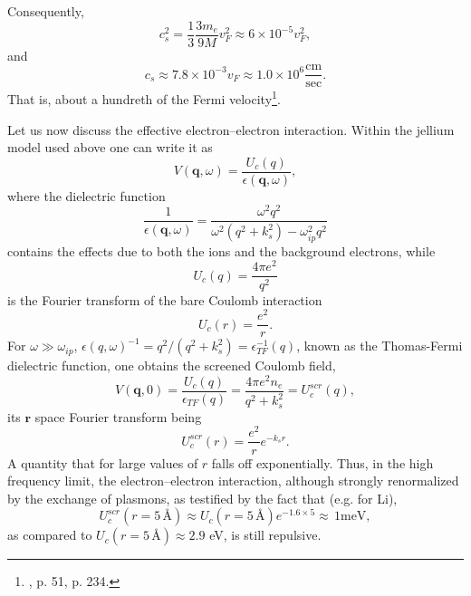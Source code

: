 Consequently,
\begin{equation}\label{eqC2AppA12}
c_s^2=\frac{1}{3}\frac{3m_e}{9M}v_F^2\approx 6\times 10^{-5}v_F^2,
\end{equation}
and
\begin{equation}\label{eqC2AppA13}
c_s\approx 7.8\times 10^{-3}v_F\approx 1.0\times 10^6 \frac{\text{cm}}{\text{sec}}.
\end{equation}
That is, about a hundreth of the Fermi velocity\footnote{\cite{Ashcroft:87}, p. 51, \cite{Ketterson:99} p. 234.}.



Let us now discuss the effective electron--electron interaction. Within the jellium model used above one can write it as
\begin{equation}\label{eqC2AppA14}
V(\mathbf q,\omega)=\frac{U_c(q)}{\epsilon(\mathbf q,\omega)},
\end{equation}
where the dielectric function
\begin{equation}\label{eqC2AppA15}
\frac{1}{\epsilon(\mathbf q,\omega)}=\frac{\omega^2q^2}{\omega^2(q^2+k_s^2)-\omega^2_{ip}q^2}
\end{equation}
contains the effects due to both the ions and the background electrons, while
\begin{equation}\label{eqC2AppA16}
U_c(q)=\frac{4\pi e^2}{q^2}
\end{equation}
is the Fourier transform of the bare Coulomb interaction
\begin{equation}\label{eqC2AppA17}
U_c(r)=\frac{e^2}{r}.
\end{equation}
For $\omega\gg \omega_{ip}$, $\epsilon(q,\omega)^{-1}=q^2/(q^2+k_s^2)=\epsilon_{TF}^{-1}(q)$, known as the Thomas-Fermi dielectric function, one obtains the  screened Coulomb field,
\begin{equation}\label{eqC2AppA18}
V(\mathbf q,0)=\frac{U_c(q)}{\epsilon_{TF}(q)}=\frac{4\pi e^2 n_e}{q^2+k_s^2}=U_c^{scr}(q),
\end{equation}
its $\mathbf r$ space Fourier transform being 
\begin{equation}\label{eqC2AppA19}
U_c^{scr}(r)=\frac{e^2}{r}e^{-k_s r}.
\end{equation}
A quantity that for large values of $r$ falls off exponentially. Thus, in the high frequency limit, the electron--electron interaction, although strongly renormalized by the exchange of plasmons, as testified by the fact that (e.g. for Li),
\begin{equation}\label{eqC2AppA20}
U_c^{scr}(r=5\,\text{\AA})\approx U_c(r=5\,\text{\AA})e^{-1.6\times 5}\approx \,1\text{meV},
\end{equation}
as compared to $U_c(r=5\,\text{\AA})\approx 2.9$ eV, is still repulsive.



